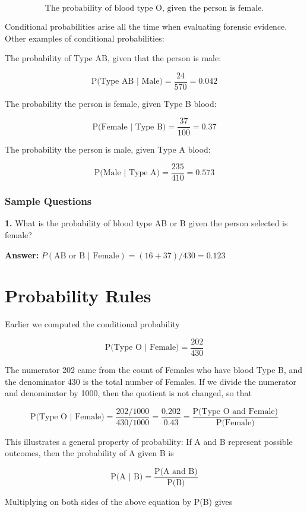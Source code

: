 \documentclass[
]{book}
\begin{document}
\[
\mbox{The probability of blood type O, given the person is female.}
\]

Conditional probabilities arise all the time when evaluating forensic evidence. Other examples of conditional probabilities:

The probability of Type AB, given that the person is male:

\[
\mbox{P(Type AB | Male)} = \frac{24}{570} = 0.042
\]

The probability the person is female, given Type B blood:

\[
\mbox{P(Female | Type B)} = \frac{37}{100} = 0.37
\]

The probability the person is male, given Type A blood:

\[
\mbox{P(Male | Type A)} = \frac{235}{410} = 0.573
\]

\hypertarget{sample-questions-4}{%
\subsection{Sample Questions}\label{sample-questions-4}}

\textbf{1.} What is the probability of blood type AB or B given the person selected is female?

\textbf{Answer:} \(P(\text{AB or B | Female}) = (16 + 37) / 430 = 0.123\)

\hypertarget{probability-rules}{%
\chapter{Probability Rules}\label{probability-rules}}

Earlier we computed the conditional probability

\[
\mbox{P(Type O | Female)} = \frac{202}{430} 
\]

The numerator 202 came from the count of Females who have blood Type B, and the denominator 430 is the total number of Females.
If we divide the numerator and denominator by 1000, then the quotient is not changed, so that

\[
\mbox{P(Type O | Female)} = \frac{202/1000}{430/1000} 
= \frac{0.202}{0.43} = \frac{\mbox{P(Type O and Female)}}{\mbox{P(Female)}}
\]

This illustrates a general property of probability: If A and B represent possible outcomes, then the probability of A given B is

\[
\mbox{P(A | B)} = \frac{\mbox{P(A and B)}}{\mbox{P(B)}}
\]

Multiplying on both sides of the above equation by P(B) gives
\end{document}
